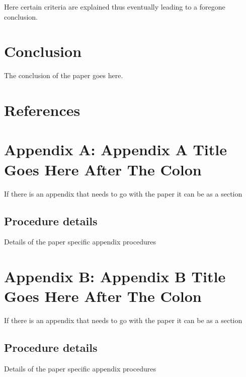 \documentclass[
  12pt,
  notitlepage]{isuthesis}
\begin{document}
Here certain criteria are explained thus eventually
leading to a foregone conclusion.

\section{Conclusion}\label{conclusion}

The conclusion of the paper goes here.
\cite{cox}

\section{References}
\printbibliography[heading=none, section=\therefsection]

\section{Appendix A: Appendix A Title Goes Here After The Colon}

If there is an appendix that needs to go with the paper it can be as a section \cite{Aup91}

\subsection{Procedure details}

Details of the paper specific appendix procedures

\section{Appendix B: Appendix B Title Goes Here After The Colon}

If there is an appendix that needs to go with the paper it can be as a section \cite{Aup91}

\subsection{Procedure details}

Details of the paper specific appendix procedures

\printbibliography

\clearpage
\pagebreak
\end{document}
